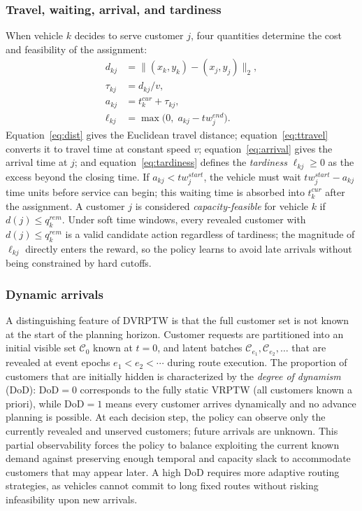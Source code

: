 \documentclass[conference]{IEEEtran}
\begin{document}
\subsubsection{Travel, waiting, arrival, and tardiness}
When vehicle $k$ decides to serve customer $j$, four quantities determine the cost and feasibility of the assignment:
\begin{align}
d_{kj}   &= \bigl\|(x_k, y_k) - (x_j, y_j)\bigr\|_2,                       \label{eq:dist}\\
\tau_{kj} &= d_{kj} / v,                                                      \label{eq:ttravel}\\
a_{kj}   &= t^{cur}_k + \tau_{kj},                                            \label{eq:arrival}\\
\ell_{kj} &= \max\!\bigl(0,\; a_{kj} - tw^{end}_j\bigr).                     \label{eq:tardiness}
\end{align}
Equation~\eqref{eq:dist} gives the Euclidean travel distance; equation~\eqref{eq:ttravel} converts it to travel time at constant speed $v$; equation~\eqref{eq:arrival} gives the arrival time at $j$; and equation~\eqref{eq:tardiness} defines the \emph{tardiness} $\ell_{kj} \geq 0$ as the excess beyond the closing time.
If $a_{kj} < tw^{start}_j$, the vehicle must wait $tw^{start}_j - a_{kj}$ time units before service can begin; this waiting time is absorbed into $t^{cur}_{k}$ after the assignment.
A customer $j$ is considered \emph{capacity-feasible} for vehicle $k$ if $d(j) \leq q^{rem}_k$.
Under soft time windows, every revealed customer with $d(j) \leq q^{rem}_k$ is a valid candidate action regardless of tardiness; the magnitude of $\ell_{kj}$ directly enters the reward, so the policy learns to avoid late arrivals without being constrained by hard cutoffs.

\subsubsection{Dynamic arrivals}
A distinguishing feature of DVRPTW is that the full customer set is not known at the start of the planning horizon.
Customer requests are partitioned into an initial visible set $\mathcal{C}_0$ known at $t=0$, and latent batches $\mathcal{C}_{e_1}, \mathcal{C}_{e_2}, \ldots$ that are revealed at event epochs $e_1 < e_2 < \cdots$ during route execution.
The proportion of customers that are initially hidden is characterized by the \emph{degree of dynamism} (DoD): $\mathrm{DoD} = 0$ corresponds to the fully static VRPTW (all customers known a priori), while $\mathrm{DoD} = 1$ means every customer arrives dynamically and no advance planning is possible.
At each decision step, the policy can observe only the currently revealed and unserved customers; future arrivals are unknown.
This partial observability forces the policy to balance exploiting the current known demand against preserving enough temporal and capacity slack to accommodate customers that may appear later.
A high DoD requires more adaptive routing strategies, as vehicles cannot commit to long fixed routes without risking infeasibility upon new arrivals.
\end{document}
